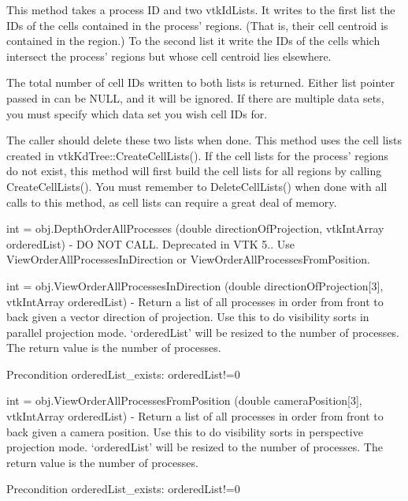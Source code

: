 \begin{DoxyItemize}
This method takes a process I\-D and two vtk\-Id\-Lists. It writes to the first list the I\-Ds of the cells contained in the process' regions. (That is, their cell centroid is contained in the region.) To the second list it write the I\-Ds of the cells which intersect the process' regions but whose cell centroid lies elsewhere.

The total number of cell I\-Ds written to both lists is returned. Either list pointer passed in can be N\-U\-L\-L, and it will be ignored. If there are multiple data sets, you must specify which data set you wish cell I\-Ds for.

The caller should delete these two lists when done. This method uses the cell lists created in vtk\-Kd\-Tree\-::\-Create\-Cell\-Lists(). If the cell lists for the process' regions do not exist, this method will first build the cell lists for all regions by calling Create\-Cell\-Lists(). You must remember to Delete\-Cell\-Lists() when done with all calls to this method, as cell lists can require a great deal of memory.  
\item {\ttfamily int = obj.\-Depth\-Order\-All\-Processes (double direction\-Of\-Projection, vtk\-Int\-Array ordered\-List)} -\/ D\-O N\-O\-T C\-A\-L\-L. Deprecated in V\-T\-K 5.. Use View\-Order\-All\-Processes\-In\-Direction or View\-Order\-All\-Processes\-From\-Position.  
\item {\ttfamily int = obj.\-View\-Order\-All\-Processes\-In\-Direction (double direction\-Of\-Projection\mbox{[}3\mbox{]}, vtk\-Int\-Array ordered\-List)} -\/ Return a list of all processes in order from front to back given a vector direction of projection. Use this to do visibility sorts in parallel projection mode. `ordered\-List' will be resized to the number of processes. The return value is the number of processes. \begin{DoxyPrecond}{Precondition}
ordered\-List\-\_\-exists\-: ordered\-List!=0  
\end{DoxyPrecond}

\item {\ttfamily int = obj.\-View\-Order\-All\-Processes\-From\-Position (double camera\-Position\mbox{[}3\mbox{]}, vtk\-Int\-Array ordered\-List)} -\/ Return a list of all processes in order from front to back given a camera position. Use this to do visibility sorts in perspective projection mode. `ordered\-List' will be resized to the number of processes. The return value is the number of processes. \begin{DoxyPrecond}{Precondition}
ordered\-List\-\_\-exists\-: ordered\-List!=0  
\end{DoxyPrecond}


\end{DoxyItemize}

